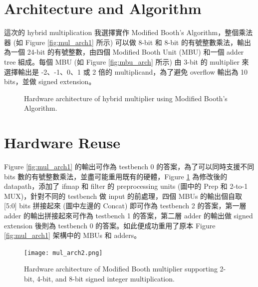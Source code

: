 \documentclass[12pt]{article}
\begin{document}
\section{Architecture and Algorithm}

這次的 hybrid multiplication 我選擇實作 Modified Booth's Algorithm，整個乘法器 (如 Figure \ref{fig:mul_arch1} 所示) 可以做 8-bit 和 8-bit 的有號整數乘法，輸出為一個 24-bit 的有號整數，由四個 Modified Booth Unit (MBU) 和一個 adder tree 組成。每個 MBU (如 Figure \ref{fig:mbu_arch} 所示) 由 3-bit 的 multiplier 來選擇輸出是 -2、-1、0、1 或 2 倍的 multiplicand，為了避免 overflow 輸出為 10 bits，並做 signed extension。

\begin{figure}[h]
    \centering
    \hfill
    \caption{Hardware architecture of hybrid multiplier using Modified Booth's Algorithm.}
\end{figure}

\section{Hardware Reuse}

Figure \ref{fig:mul_arch1} 的輸出可作為 testbench 0 的答案，為了可以同時支援不同 bits 數的有號整數乘法，並盡可能重用既有的硬體，Figure \ref{fig:mul_arch2} 為修改後的 datapath，添加了 ifmap 和 filter 的 preprocessing units (圖中的 Prep 和 2-to-1 MUX)，針對不同的 testbench 做 input 的前處理，四個 MBUs 的輸出個自取 [5:0] bits 拼接起來 (圖中左邊的 Concat) 即可作為 testbench 2 的答案，第一層 adder 的輸出拼接起來可作為 testbench 1 的答案，第二層 adder 的輸出做 signed extension 後則為 testbench 0 的答案。如此便成功重用了原本 Figure \ref{fig:mul_arch1} 架構中的 MBUs 和 adders。

\begin{figure}[h]
    \centering
    \texttt{[image: mul\_arch2.png]}
    \caption{Hardware architecture of Modified Booth multiplier supporting 2-bit, 4-bit, and 8-bit signed integer multiplication.}
    \label{fig:mul_arch2}
\end{figure}
\newpage
\end{document}
